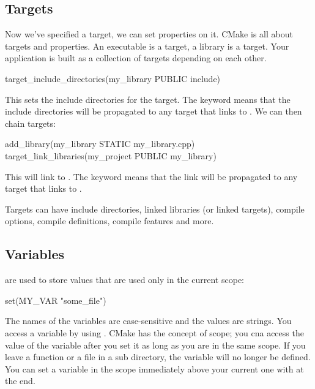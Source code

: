 \subsection{Targets}

Now we've specified a target, we can set properties on it.
CMake is all about targets and properties. An executable is a target, a library is a target. Your
application is built as a collection of targets depending on each other.


\begin{neonlisting}[language=C++]{}
target_include_directories(my_library PUBLIC include)
\end{neonlisting}

This sets the include directories for the target. The  keyword means that the include directories will be propagated to any target that links to .
We can then chain targets:

\begin{neonlisting}[language=C++]{}
add_library(my_library STATIC my_library.cpp)
target_link_libraries(my_project PUBLIC my_library)
\end{neonlisting}

This will link  to . The  keyword means that the link will be propagated to any target that links to .

Targets can have include directories, linked libraries (or linked targets), compile options, compile definitions, 
compile features and more.

\subsection{Variables}

 are used to store values that are used only in the current scope:

\begin{neonlisting}[language=C++]{}
set(MY_VAR "some_file") 
\end{neonlisting}

The names of the variables are case-sensitive and the values are strings. You access a variable by using \inlinecode{\$\{\}}.
CMake has the concept of scope; you cna access the value of the variable after you set it as long as you are in the same scope. If you leave a function or a file in a sub directory, the variable will 
no longer be defined. You can set a variable in the scope immediately above your current one with  at the end. 

